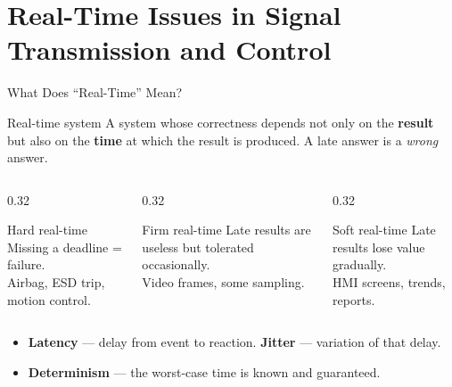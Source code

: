 \documentclass[aspectratio=169]{beamer}
\begin{document}
	\section{Real-Time Issues in Signal Transmission and Control}
	\begin{frame}{What Does ``Real-Time'' Mean?}
		\begin{block}{Real-time system}
			A system whose correctness depends not only on the \textbf{result} but also on the \textbf{time} at which the result is produced. A late answer is a \emph{wrong} answer.
		\end{block}
		\begin{columns}[T]
			\begin{column}{0.32\textwidth}
				\begin{block}{Hard real-time}
					\small Missing a deadline = failure.\\ Airbag, ESD trip, motion control.
				\end{block}
			\end{column}
			\begin{column}{0.32\textwidth}
				\begin{block}{Firm real-time}
					\small Late results are useless but tolerated occasionally.\\ Video frames, some sampling.
				\end{block}
			\end{column}
			\begin{column}{0.32\textwidth}
				\begin{block}{Soft real-time}
					\small Late results lose value gradually.\\ HMI screens, trends, reports.
				\end{block}
			\end{column}
		\end{columns}
		\vspace{0.2cm}
		\begin{itemize}\small
			\item \textbf{Latency} --- delay from event to reaction. \quad \textbf{Jitter} --- variation of that delay.
			\item \textbf{Determinism} --- the worst-case time is known and guaranteed.
		\end{itemize}
	\end{frame}
\end{document}
